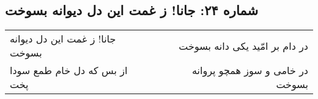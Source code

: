 \begin{center}
\section*{شماره ۲۴: جانا! ز غمت این دل دیوانه بسوخت}
\label{sec:024}
\begin{longtable}{l p{0.5cm} r}
جانا! ز غمت این دل دیوانه بسوخت
&&
در دام بر امّید یکی دانه بسوخت
\\
از بس که دل خام طمع سودا پخت
&&
در خامی و سوز همچو پروانه بسوخت
\\
\end{longtable}
\end{center}
